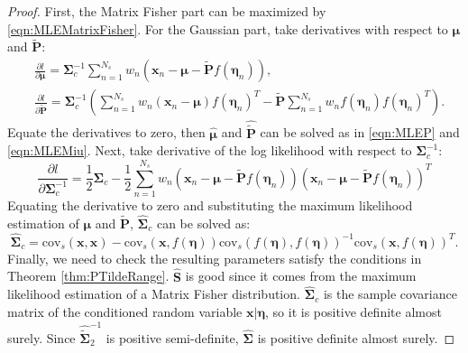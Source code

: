 \documentclass[12pt]{article}
\begin{document}
\begin{proof}
	First, the Matrix Fisher part can be maximized by \eqref{eqn:MLEMatrixFisher}.
	For the Gaussian part, take derivatives with respect to $\bm{\mu}$ and $\tilde{\mathbf{P}}$:
	\begin{align}
		&\frac{\partial l}{\partial \bm{\mu}} = \mathbf{\Sigma}_c^{-1}\sum_{n=1}^{N_s}w_n\left(\bm{x}_n-\bm{\mu}-\tilde{\mathbf{P}}f(\bm{\eta}_n)\right), \\
		&\frac{\partial l}{\partial \tilde{\mathbf{P}}} = \mathbf{\Sigma}_c^{-1} \left(\sum_{n=1}^{N_s}w_n(\bm{x}_n-\bm{\mu})f(\bm{\eta}_n)^T - \tilde{\mathbf{P}}\sum_{n=1}^{N_s}w_nf(\bm{\eta}_n)f(\bm{\eta}_n)^T\right).
		\label{eqn:logDeriP0}
	\end{align}
	Equate the derivatives to zero, then $\hat{\bm{\mu}}$ and $\hat{\tilde{\mathbf{P}}}$ can be solved as in \eqref{eqn:MLEP} and \eqref{eqn:MLEMiu}.
	Next, take derivative of the log likelihood with respect to $\mathbf{\Sigma}_c^{-1}$:
	\begin{equation}
		\frac{\partial l}{\partial \mathbf{\Sigma}_c^{-1}} = \frac{1}{2}\mathbf{\Sigma}_c - \frac{1}{2}\sum_{n=1}^{N_s}w_n\left(\bm{x}_n-\bm{\mu}-\tilde{\mathbf{P}}f(\bm{\eta}_n)\right)\left(\bm{x}_n-\bm{\mu}-\tilde{\mathbf{P}}f(\bm{\eta}_n)\right)^T
	\end{equation}
	Equating the derivative to zero and substituting the maximum likelihood estimation of $\bm{\mu}$ and $\tilde{\mathbf{P}}$, $\hat{\mathbf{\Sigma}}_c$ can be solved as:
	\begin{equation}
		\hat{\mathbf{\Sigma}}_c = \mathrm{cov}_s(\bm{x},\bm{x}) - \mathrm{cov}_s(\bm{x},f(\bm{\eta}))\mathrm{cov}_s(f(\bm{\eta}),f(\bm{\eta}))^{-1}\mathrm{cov}_s(\bm{x},f(\bm{\eta}))^T.
	\end{equation}
	Finally, we need to check the resulting parameters satisfy the conditions in Theorem \ref{thm:PTildeRange}.
	$\hat{\mathbf{S}}$ is good since it comes from the maximum likelihood estimation of a Matrix Fisher distribution.
	$\hat{\mathbf{\Sigma}}_c$ is the sample covariance matrix of the conditioned random variable $\bm{x}|\bm{\eta}$, so it is positive definite almost surely.
	Since $\hat{\tilde{\mathbf{\Sigma}}}_2^{-1}$ is positive semi-definite, $\hat{\mathbf{\Sigma}}$ is positive definite almost surely.
\end{proof}

\appendix
\end{document}
